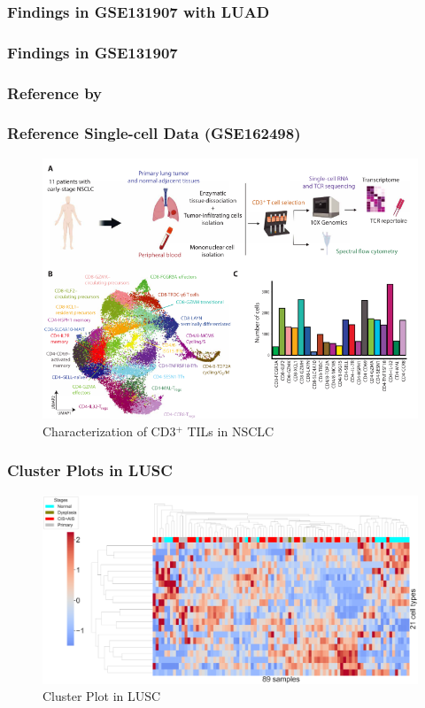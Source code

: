 \documentclass{beamer}
\begin{document}
    \begin{frame}[allowframebreaks]
        \frametitle{Findings in GSE131907 with LUAD}
    \end{frame}

    \begin{frame}[allowframebreaks]
        \frametitle{Findings in GSE131907}
    \end{frame}

    \subsubsection{Reference by \protect{}}
    \begin{frame}
        \frametitle{Reference Single-cell Data (GSE162498)}

        \begin{figure}
            \includegraphics[width=0.8 \linewidth]{figures/LungCancer/reference_2.png}
            \caption{Characterization of CD3$^+$ TILs in NSCLC \protect\cite{singlecell2}}
        \end{figure}
    \end{frame}

    \begin{frame}
        \frametitle{Cluster Plots in LUSC}

        \begin{figure}
            \includegraphics[width=0.9 \linewidth]{figures/BisqueRNA/clustermap/STAR.FPKM.GSE162498.SQC.pdf}
            \caption{Cluster Plot in LUSC}
        \end{figure}
    \end{frame}
\end{document}
